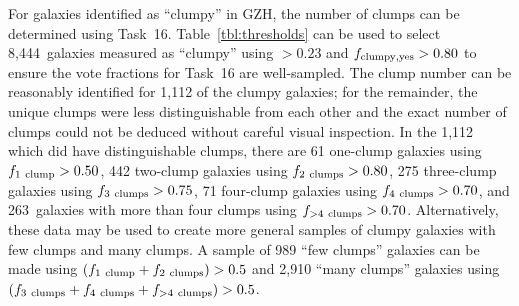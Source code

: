 \documentclass[twocolumn]{aastex6}
\begin{document}
For galaxies identified as ``clumpy'' in GZH, the number of clumps can be
determined using Task~16. Table~\ref{tbl:thresholds} can be used to select
8,444~galaxies measured as ``clumpy'' using \ffeatures$> 0.23$ and $f_{\rm
clumpy,yes}>0.80$ to ensure the vote fractions for Task~16 are well-sampled.
The clump number can be reasonably identified for 1,112 of the clumpy galaxies;
for the remainder, the unique clumps were less distinguishable from each other
and the exact number of clumps could not be deduced without careful visual
inspection. In the 1,112 which did have distinguishable clumps, there are
61 one-clump galaxies using $f_{\rm 1~clump}>0.50$, 442 two-clump galaxies
using $f_{\rm 2~clumps}>0.80$, 275 three-clump galaxies using $f_{\rm
3~clumps}>0.75$, 71 four-clump galaxies using $f_{\rm 4~clumps} > 0.70$,
and 263~galaxies with more than four clumps using $f_{\rm >4~clumps}>0.70$.
Alternatively, these data may be used to create more general samples of
clumpy galaxies with few clumps and many clumps. A sample of 989 ``few
clumps'' galaxies can be made using $(f_{\rm 1~clump} + f_{\rm 2~clumps}) >
0.5$ and 2,910 ``many clumps'' galaxies using $(f_{\rm 3~clumps}+f_{\rm
4~clumps}+f_{\rm >4~clumps})>0.5$.
\end{document}
